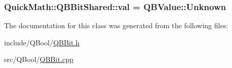 \subsubsection[{val}]{ Quick\+Math\+::\+Q\+B\+Bit\+Shared\+::val = {\bf Q\+B\+Value\+::\+Unknown}\hspace{0.3cm}{\ttfamily [private]}}\label{classQuickMath_1_1QBBitShared_ae31aef3bff69da20dbc21799840c3b55}


The documentation for this class was generated from the following files\+:\begin{DoxyCompactItemize}
\item 
include/\+Q\+Bool/\hyperlink{QBBit_8h}{Q\+B\+Bit.\+h}\item 
src/\+Q\+Bool/\hyperlink{QBBit_8cpp}{Q\+B\+Bit.\+cpp}\end{DoxyCompactItemize}
